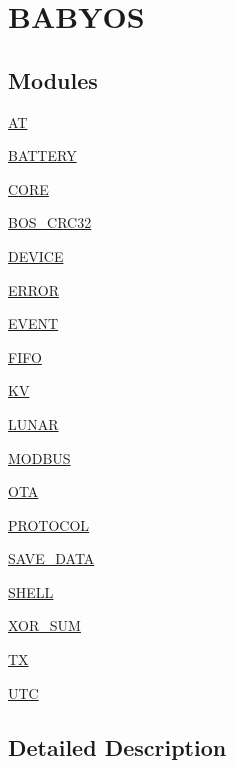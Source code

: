 \hypertarget{group___b_a_b_y_o_s}{}\section{B\+A\+B\+Y\+OS}
\label{group___b_a_b_y_o_s}
\subsection*{Modules}
\begin{DoxyCompactItemize}
\item 
\mbox{\hyperlink{group___a_t}{AT}}
\item 
\mbox{\hyperlink{group___b_a_t_t_e_r_y}{B\+A\+T\+T\+E\+RY}}
\item 
\mbox{\hyperlink{group___c_o_r_e}{C\+O\+RE}}
\item 
\mbox{\hyperlink{group___b_o_s___c_r_c32}{B\+O\+S\+\_\+\+C\+R\+C32}}
\item 
\mbox{\hyperlink{group___d_e_v_i_c_e}{D\+E\+V\+I\+CE}}
\item 
\mbox{\hyperlink{group___e_r_r_o_r}{E\+R\+R\+OR}}
\item 
\mbox{\hyperlink{group___e_v_e_n_t}{E\+V\+E\+NT}}
\item 
\mbox{\hyperlink{group___f_i_f_o}{F\+I\+FO}}
\item 
\mbox{\hyperlink{group___k_v}{KV}}
\item 
\mbox{\hyperlink{group___l_u_n_a_r}{L\+U\+N\+AR}}
\item 
\mbox{\hyperlink{group___m_o_d_b_u_s}{M\+O\+D\+B\+US}}
\item 
\mbox{\hyperlink{group___o_t_a}{O\+TA}}
\item 
\mbox{\hyperlink{group___p_r_o_t_o_c_o_l}{P\+R\+O\+T\+O\+C\+OL}}
\item 
\mbox{\hyperlink{group___s_a_v_e___d_a_t_a}{S\+A\+V\+E\+\_\+\+D\+A\+TA}}
\item 
\mbox{\hyperlink{group___s_h_e_l_l}{S\+H\+E\+LL}}
\item 
\mbox{\hyperlink{group___x_o_r___s_u_m}{X\+O\+R\+\_\+\+S\+UM}}
\item 
\mbox{\hyperlink{group___t_x}{TX}}
\item 
\mbox{\hyperlink{group___u_t_c}{U\+TC}}
\end{DoxyCompactItemize}


\subsection{Detailed Description}

